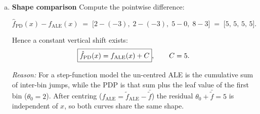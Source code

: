 {\begin{enumerate}[(a)]
\begin{enumerate}[1.]
      \item \emph{Centering}  
            Evaluate \(\widetilde f_{\mathrm{ALE}}\) at the five observations:

            \[
              \bigl(0,\;0,\;3,\;6,\;6\bigr)
              \quad\Longrightarrow\quad
              \bar{\widetilde f}=\tfrac{0+0+3+6+6}{5}=3.
            \]

            \[
              f_{\mathrm{ALE}}(x)=\widetilde f_{\mathrm{ALE}}(x)-3.
            \]

            \[
            \boxed{
            \begin{array}{c|cccc}
            x & 1.0 & 2.5 & 3.5 & 5.0 \\ \hline
            f_{\mathrm{ALE}}(x) & -3 & -3 & 0 & 3
            \end{array}}
            \]
      \end{enumerate}

\item \textbf{Shape comparison}  
      Compute the pointwise difference:

      \[
      \hat f_{\mathrm{PD}}(x)-f_{\mathrm{ALE}}(x)
      \;=\;
      \bigl[2-(-3),\;2-(-3),\;5-0,\;8-3\bigr]
      \;=\;
      \bigl[5,\,5,\,5,\,5\bigr].
      \]

      Hence a constant vertical shift exists:
      \[
        \boxed{%
        \hat f_{\mathrm{PD}}(x)=f_{\mathrm{ALE}}(x)+C},
        \qquad C=5.
      \]

      \textit{Reason:} For a step-function model the
      un-centred ALE is the cumulative sum of inter-bin jumps,
      while the PDP is that sum plus the leaf value of the first bin
      (\(\theta_0=2\)).  After centring
      (\(f_{\mathrm{ALE}}=\widetilde f_{\mathrm{ALE}}-\bar{\widetilde f}\))
      the residual \(\theta_0+\bar{\widetilde f}=5\) is independent of \(x\),
      so both curves share the same shape.
\end{enumerate}
}